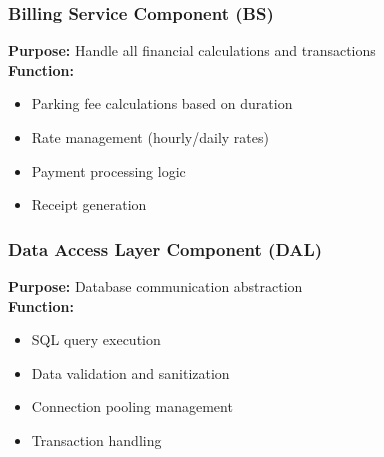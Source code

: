 \subsubsection{Billing Service Component (BS)}
    \textbf{Purpose:} Handle all financial calculations and transactions\\
    \textbf{Function:}

    \begin{itemize}
        \item Parking fee calculations based on duration
        \item Rate management (hourly/daily rates)
        \item Payment processing logic
        \item Receipt generation
    \end{itemize}
\subsubsection{Data Access Layer Component (DAL)}
    \textbf{Purpose:} Database communication abstraction\\
    \textbf{Function:}
    \begin{itemize}
        \item SQL query execution
        \item Data validation and sanitization
        \item Connection pooling management
        \item Transaction handling
    \end{itemize}
